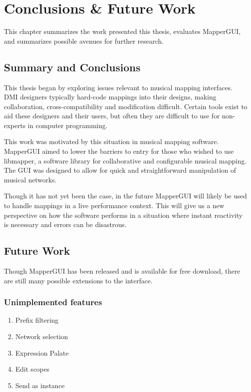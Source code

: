 \chapter{Conclusions \& Future Work}

This chapter summarizes the work presented this thesis, evaluates MapperGUI, and summarizes possible avenues for further research.

\section{Summary and Conclusions}

This thesis began by exploring issues relevant to musical mapping interfaces. DMI designers typically hard-code mappings into their designs, making collaboration, cross-compatibility and modification difficult. Certain tools exist to aid these designers and their users, but often they are difficult to use for non-experts in computer programming. 

This work was motivated by this situation in musical mapping software. MapperGUI aimed to lower the barriers to entry for those who wished to use libmapper, a software library for collaborative and configurable musical mapping. The GUI was designed to allow for quick and straightforward manipulation of musical networks. 

Though it has not yet been the case, in the future MapperGUI will likely be used to handle mappings in a live performance context. This will give us a new perspective on how the software performs in a situation where instant reactivity is necessary and errors can be disastrous. 

\section{Future Work}

Though MapperGUI has been released and is available for free download, there are still many possible extensions to the interface. 

	\subsection{Unimplemented features}
	\begin{enumerate}
		\item Prefix filtering
		\item Network selection
		\item Expression Palate 
		\item Edit scopes
		\item Send as instance
	\end{enumerate}
